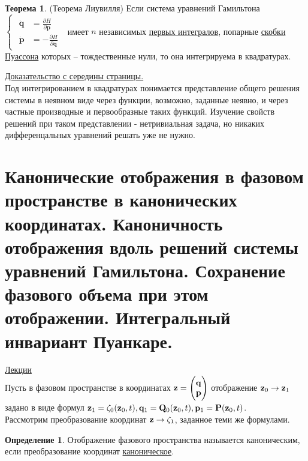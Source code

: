 \documentclass[specialist, subf, href, colorlinks=true, 12pt, times, mtpro, final]{disser}
\theoremstyle{definition}
\newtheorem{defn}{Определение}[section]
\newtheorem{theorem}{Теорема}[section]
\begin{document}
    \begin{theorem} (Теорема Лиувилля) 
  Если система уравнений Гамильтона 
		$\begin{cases}
   			\begin{matrix}
				\dot{\mathbf{q}} &= \frac{\partial H}{\partial \mathbf{p}}\\
				\dot{\mathbf{p}} &= -\frac{\partial H}{\partial \mathbf{q}}
			\end{matrix}
		\end{cases}$ имеет $n$ независимых \hyperlink{lects.17}{первых интегралов}, попарные \hyperlink{lects.17}{скобки Пуассона} которых -- тождественные нули, то она интегрируема в квадратурах.
	\end{theorem}
	\hyperlink {lects.37}{Доказательство с середины страницы.}\\
	Под интегрированием в квадратурах понимается представление общего решения системы в неявном виде через функции, возможно, заданные неявно, и через частные производные и первообразные таких функций. Изучение свойств решений при таком представлении - нетривиальная задача, но никаких дифференцальных уравнений решать уже не нужно.

	

    
    \section{Канонические отображения в фазовом пространстве в канонических координатах. Каноничность отображения вдоль решений системы уравнений Гамильтона. Сохранение фазового объема при этом отображении. Интегральный инвариант Пуанкаре.}
     \label{22}
	\hyperlink {lects.39}{Лекции} \\
    
    Пусть в фазовом пространстве в координатах $\mathbf{z} = 	
    \Biggl(
   		\begin{matrix} 
    		\mathbf{q} \\ \mathbf{p} 
    	\end{matrix}
    \Biggr)
    $
    отображение $\mathbf{z}_0 \to \mathbf{z}_1$ задано в виде формул $\mathbf{z}_1 = \zeta_0(\mathbf{z}_0,t), \mathbf{q}_1 = \mathbf{Q}_0(\mathbf{z}_0,t), \mathbf{p}_1 = \mathbf{P}(\mathbf{z}_0,t)$.\\
    Рассмотрим преобразование координат $\mathbf{z} \to \zeta_1$, заданное теми же формулами.\\
    
    \begin{defn}
    Отображение фазового пространства называется каноническим, если преобразование координат \hyperlink{lects.23}{каноническое}.
    \end{defn}
    
\end{document}
